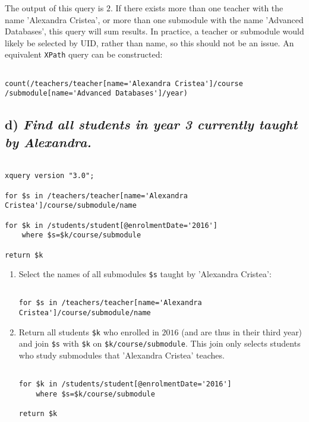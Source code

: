 \documentclass[11pt]{article} %
\begin{document}
The output of this query is $2$. If there exists more than one teacher with the name 'Alexandra Cristea', or more than one submodule with the name 'Advanced Databases', this query will sum results. In practice, a teacher or submodule would likely be selected by UID, rather than name, so this should not be an issue. An equivalent \verb|XPath| query can be constructed:

\begin{verbatim}

count(/teachers/teacher[name='Alexandra Cristea']/course
/submodule[name='Advanced Databases']/year)

\end{verbatim}

\clearpage
\subsection*{d) \textit{Find all students in year 3 currently taught by Alexandra.}}

\begin{verbatim}

xquery version "3.0";

for $s in /teachers/teacher[name='Alexandra Cristea']/course/submodule/name

for $k in /students/student[@enrolmentDate='2016']
	where $s=$k/course/submodule

return $k

\end{verbatim}

\begin{enumerate}

\item{Select the names of all submodules \verb|$s| taught by 'Alexandra Cristea':}

\begin{verbatim}

for $s in /teachers/teacher[name='Alexandra Cristea']/course/submodule/name

\end{verbatim}

\item{Return all students \verb|$k| who enrolled in $2016$ (and are thus in their third year) and join \verb|$s| with \verb|$k| on \verb|$k/course/submodule|. This join only selects students who study submodules that 'Alexandra Cristea' teaches.}

\begin{verbatim}

for $k in /students/student[@enrolmentDate='2016']
	where $s=$k/course/submodule

return $k
\end{verbatim}

\end{enumerate}
\end{document}
